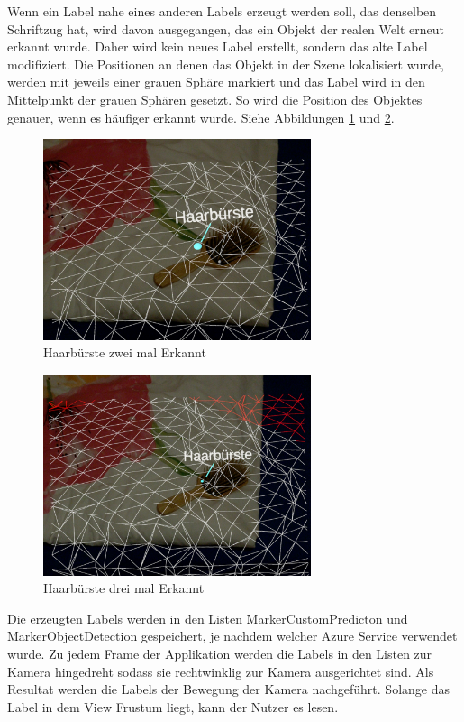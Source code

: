 Wenn ein Label nahe eines anderen Labels erzeugt werden soll, das denselben Schriftzug hat, wird davon ausgegangen, das ein Objekt der realen Welt erneut erkannt wurde. Daher wird kein neues Label erstellt, sondern das alte Label modifiziert.
Die Positionen an denen das Objekt in der Szene lokalisiert wurde, werden mit jeweils einer grauen Sphäre markiert und das Label wird in den Mittelpunkt der grauen Sphären gesetzt.
So  wird die Position des Objektes genauer, wenn es häufiger erkannt wurde. Siehe Abbildungen \ref{image:multi1} und \ref{image:multi2}.

\begin{figure}[H]
	\centering
	\includegraphics[width=0.7\textwidth]{images/ML_20201004_19.12.40.jpg}
	\caption[]{Haarbürste zwei mal Erkannt}
	\label{image:multi1}
\end{figure}


\begin{figure}[H]
	\centering
	\includegraphics[width=0.7\textwidth]{images/ML_20201004_19.13.07.jpg}
	\caption[]{Haarbürste drei mal Erkannt}
	\label{image:multi2}
\end{figure}

Die erzeugten Labels werden in den Listen MarkerCustomPredicton und MarkerObjectDetection gespeichert, je nachdem welcher Azure Service verwendet wurde. 
Zu jedem Frame der Applikation werden die Labels in den Listen zur Kamera hingedreht sodass sie rechtwinklig zur Kamera ausgerichtet sind. Als Resultat werden die Labels der Bewegung der Kamera nachgeführt. Solange das Label in dem View Frustum liegt, kann der Nutzer es lesen.

